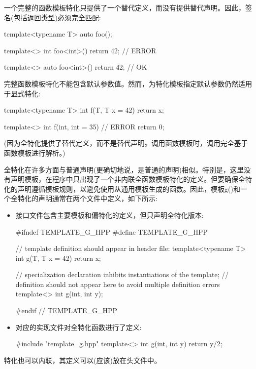 一个完整的函数模板特化只提供了一个替代定义，而没有提供替代声明。因此，签名(包括返回类型)必须完全匹配:

\begin{cpp}
template<typename T> auto foo();

template<> int foo<int>() { return 42; }  // ERROR

template<> auto foo<int>() { return 42; } // OK
\end{cpp}

完整函数模板特化不能包含默认参数值。然而，为特化模板指定默认参数仍然适用于显式特化:

\begin{cpp}
template<typename T>
int f(T, T x = 42)
{
	return x;
}

template<> int f(int, int = 35) // ERROR
{
	return 0;
}
\end{cpp}

(因为全特化提供了替代定义，而不是替代声明。调用函数模板时，调用完全基于函数模板进行解析。)

全特化在许多方面与普通声明(更确切地说，是普通的声明)相似。特别是，这里没有声明模板，在程序中只出现了一个非内联全函数模板特化的定义。但要确保全特化的声明遵循模板规则，以避免使用从通用模板生成的函数。因此，模板g()和一个全特化的声明通常在两个文件中定义，如下所示:

\begin{itemize}
\item 
接口文件包含主要模板和偏特化的定义，但只声明全特化版本:

\begin{cpp}
#ifndef TEMPLATE_G_HPP
#define TEMPLATE_G_HPP

// template definition should appear in header file:
template<typename T>
int g(T, T x = 42)
{
	return x;
}

// specialization declaration inhibits instantiations of the template;
// definition should not appear here to avoid multiple definition errors
template<> int g(int, int y);

#endif // TEMPLATE_G_HPP
\end{cpp}

\item 
对应的实现文件对全特化函数进行了定义:

\begin{cpp}
#include "template_g.hpp"
template<> int g(int, int y)
{
	return y/2;
}
\end{cpp}
\end{itemize}

特化也可以内联，其定义可以(应该)放在头文件中。

